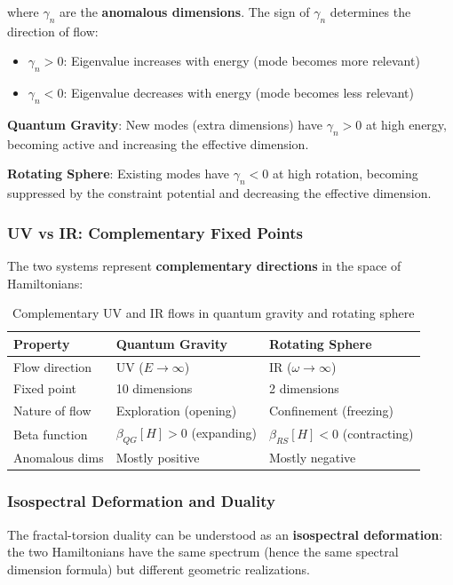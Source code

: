\documentclass[12pt,a4paper]{article}
\begin{document}
where $\gamma_n$ are the \textbf{anomalous dimensions}. The sign of $\gamma_n$ determines the direction of flow:
\begin{itemize}
    \item $\gamma_n > 0$: Eigenvalue increases with energy (mode becomes more relevant)
    \item $\gamma_n < 0$: Eigenvalue decreases with energy (mode becomes less relevant)
\end{itemize}

\textbf{Quantum Gravity}: New modes (extra dimensions) have $\gamma_n > 0$ at high energy, becoming active and increasing the effective dimension.

\textbf{Rotating Sphere}: Existing modes have $\gamma_n < 0$ at high rotation, becoming suppressed by the constraint potential and decreasing the effective dimension.

\subsubsection{UV vs IR: Complementary Fixed Points}

The two systems represent \textbf{complementary directions} in the space of Hamiltonians:

\begin{table}[h]
\centering
\begin{tabular}{p{3cm}p{5cm}p{5cm}}
\toprule
\textbf{Property} & \textbf{Quantum Gravity} & \textbf{Rotating Sphere} \\
\midrule
Flow direction & UV ($E \to \infty$) & IR ($\omega \to \infty$) \\
Fixed point & 10 dimensions & 2 dimensions \\
Nature of flow & Exploration (opening) & Confinement (freezing) \\
Beta function & $\beta_{QG}[H] > 0$ (expanding) & $\beta_{RS}[H] < 0$ (contracting) \\
Anomalous dims & Mostly positive & Mostly negative \\
\bottomrule
\end{tabular}
\caption{Complementary UV and IR flows in quantum gravity and rotating sphere}
\end{table}

\subsubsection{Isospectral Deformation and Duality}

The fractal-torsion duality can be understood as an \textbf{isospectral deformation}: the two Hamiltonians have the same spectrum (hence the same spectral dimension formula) but different geometric realizations.
\end{document}

